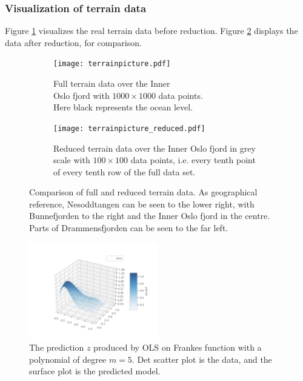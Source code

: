 \subsubsection*{Visualization of terrain data}
Figure \ref{fig:terrainpic} visualizes the real terrain data before reduction. Figure \ref{fig:terrainpic_reduced} displays the data after reduction, for comparison.

\begin{figure}[htbp]
	\centering
	\begin{subfigure}{.5\textwidth}
		\centering
		\texttt{[image: terrainpicture.pdf]}
		\caption{Full terrain data over the Inner \\Oslo fjord with $1000\times 1000$ data points. \\Here black represents the ocean level.}
		\label{fig:terrainpic}
	\end{subfigure}%
	\begin{subfigure}{.5\textwidth}
		\centering
		\texttt{[image: terrainpicture\_reduced.pdf]}
		\caption{Reduced terrain data over the Inner Oslo fjord in grey scale with $100\times 100$ data points, i.e. every tenth point of every tenth row of the full data set.}
	\label{fig:terrainpic_reduced}
	\end{subfigure}
	\caption{Comparison of full and reduced terrain data. As geographical reference, Nesoddtangen can be seen to the lower right, with Bunnefjorden to the right and the Inner Oslo fjord in the centre. Parts of Drammensfjorden can be seen to the far left.}
	\label{fig:terrain}
\end{figure}

\begin{figure}[htbp]
	\centering
	\includegraphics[width=0.5\textwidth]{../figures/franke_visual}
	\caption{The prediction $z$ produced by OLS on Frankes function with a polynomial of degree $m=5$. Det scatter plot is the data, and the surface plot is the predicted model.}
	\label{fig:franke_visual3D}
\end{figure}

